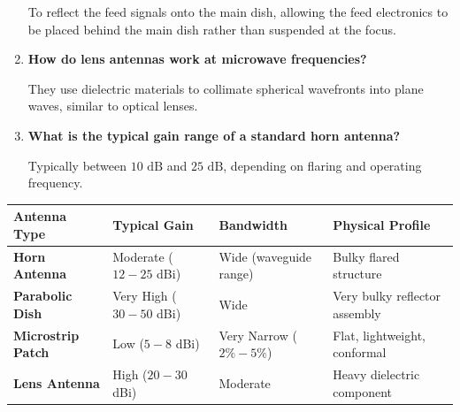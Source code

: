\documentclass[12pt,a4paper]{article}
\newcommand{\Q}[1]{\textbf{#1}\par\noindent\ignorespaces}
\renewcommand{\arraystretch}{1.45}
\begin{document}
\begin{tcolorbox}[exambox, title={\textbf{Frequently Asked / Viva Questions}}]
\begin{enumerate}[topsep=0pt, label=\textbf{Q\arabic*.}, itemsep=5pt]
    To reflect the feed signals onto the main dish, allowing the feed electronics to be placed behind the main dish rather than suspended at the focus.
  \item \Q{How do lens antennas work at microwave frequencies?}
    They use dielectric materials to collimate spherical wavefronts into plane waves, similar to optical lenses.
  \item \Q{What is the typical gain range of a standard horn antenna?}
    Typically between $10\text{ dB}$ and $25\text{ dB}$, depending on flaring and operating frequency.
\end{enumerate}
\end{tcolorbox}

\begin{tcolorbox}[tikzbox, title={Comparison of Microwave Antennas}]
\renewcommand{\arraystretch}{1.4}
\par\noindent
{\renewcommand{\arraystretch}{1.55}%
\begin{tabularx}{\linewidth}{|B{3.0cm}|Y|Y|Y|}\hline
\textbf{Antenna Type} & \textbf{Typical Gain} & \textbf{Bandwidth} & \textbf{Physical Profile} \\
\hline
\textbf{Horn Antenna} & Moderate ($12 - 25$ dBi) & Wide (waveguide range) & Bulky flared structure \\[4pt]
\hline
\textbf{Parabolic Dish} & Very High ($30 - 50$ dBi) & Wide & Very bulky reflector assembly \\
\hline
\textbf{Microstrip Patch} & Low ($5 - 8$ dBi) & Very Narrow ($2\% - 5\%$) & Flat, lightweight, conformal \\[4pt]
\hline
\textbf{Lens Antenna} & High ($20 - 30$ dBi) & Moderate & Heavy dielectric component \\
\hline
\end{tabularx}
}
\end{tcolorbox}
\end{document}
